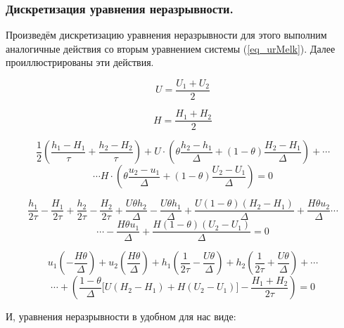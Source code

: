 

\subsubsection{Дискретизация уравнения неразрывности.}

Произведём дискретизацию уравнения неразрывности для этого выполним аналогичные действия со вторым уравнением системы (\ref{eq_urMelk}). Далее проиллюстрированы эти действия.

$$
   \displaystyle U = \frac{U_1+U_2}{2}
$$

$$
   \displaystyle H = \frac{H_1+H_2}{2}
$$

$$
   \displaystyle \frac{1}{2} \left( \frac{h_1-H_1}{\tau} + \frac{h_2-H_2}{\tau} \right) + U \cdot \left( \theta \frac{h_2-h_1}{\Delta} + (1-\theta) \frac{H_2-H_1}{\Delta} \right) + \cdots
$$
$$
   \displaystyle \cdots H \cdot \left( \theta \frac{u_2-u_1}{\Delta} + (1-\theta) \frac{U_2-U_1}{\Delta} \right) = 0
$$

\vspace{1cm}

$$
   \displaystyle \frac{h_1}{2\tau} - \frac{H_1}{2\tau} + \frac{h_2}{2\tau} - \frac{H_2}{2\tau} + \frac{U\theta h_2}{\Delta} -\frac{U\theta h_1}{\Delta} + \frac{U(1-\theta)(H_2-H_1)}{\Delta} + \frac{H\theta u_2}{\Delta}  \cdots
$$
$$
   \displaystyle \cdots -\frac{H\theta u_1}{\Delta} + \frac{H(1-\theta)(U_2-U_1)}{\Delta} = 0
$$

\vspace{1cm}

$$
   \displaystyle u_1 \left( - \frac{H\theta}{\Delta} \right) + u_2 \left( \frac{H\theta}{\Delta} \right) + h_1 \left( \frac{1}{2\tau} - \frac{U\theta}{\Delta} \right) + h_2 \left( \frac{1}{2\tau} + \frac{U\theta}{\Delta} \right) + \cdots
$$
$$
   \displaystyle \cdots + \left( \frac{1-\theta}{\Delta} \biggl[ U(H_2-H_1) + H(U_2-U_1) \biggr] - \frac{H_1+H_2}{2\tau} \right) = 0
$$

\vspace{1cm}

И, уравнения неразрывности в удобном для нас виде:

